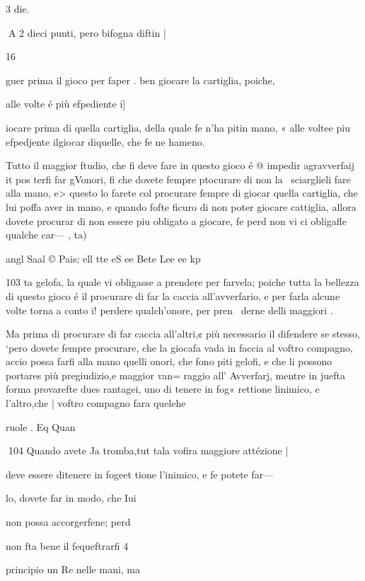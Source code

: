 \documentclass[11pt,a6paper]{article}
\begin{document}
3 die.

 

 

 
A 2
dieci punti, pero bifogna diftin |

16

guer prima il gioco per faper .
ben giocare la cartiglia, poiche,

alle volte é più efpediente i]

iocare prima di quella cartiglia, della quale fe n’ha pitin
mano, « alle voltee piu efpedjente ilgiocar diquelle, che
fe ne hameno.

Tutto il maggior ftudio, che
fi deve fare in questo gioco é
@ impedir agravverfaij it pos
terfi far gVonori, fi che dovete
fempre ptocurare di non la~
sciarglieli fare alla mano, e>
questo lo farete col procurare
fempre di giocar quella cartiglia, che lui poffa aver in mano, e quando fofte ficuro di non
poter giocare cattiglia, allora
dovete procurar di non essere
piu obligato a giocare, fe perd
non vi ci obligafle qualche car—
, ta)

 

angl Saal © Pais; ell tte eS ee Bete Lee ee kp

 
 

103
ta gelofa, la quale vi obligasse
a prendere per farvela; poiche
tutta la bellezza di questo gioco
é il procurare di far la caccia
all’avverfario, e per farla alcune volte torna a conto i! perdere qualch’onore, per pren~
derne delli maggiori .

Ma prima di procurare di far
caccia all’altri,¢ più necessario il
difendere se stesso, ‘pero dovete
fempre procurare, che la giocafa vada in faccia al voftro compagno, accio possa farfi alla mano quelli onori, che fono piti gelofi, e che li possono portares
più pregiudizio,e maggior van=
raggio all’ Avverfarj, mentre in
juefta forma provarefte dues
rantagei, uno di tenere in fog«
rettione linimico, e l’altro,che
| voftro compagno fara quelehe

ruole .
Eq Quan
 
104
Quando avete Ja tromba,tut
tala vofira maggiore attézione |

deve essere ditenere in fogeet
tione l’inimico, e fe potete far—

lo, dovete far in modo, che Iui

non possa accorgerfene; perd 

non fta bene il fequeftrarfi 4

principio un Re nelle mani, ma
\end{document}
